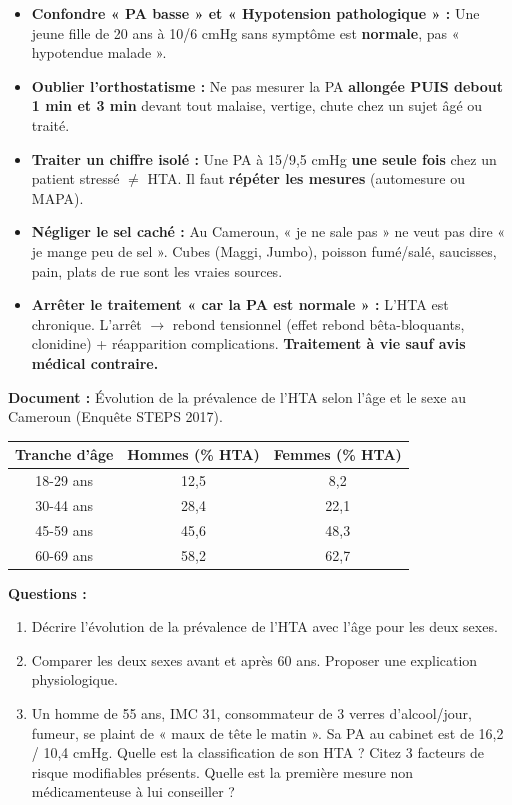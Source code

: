 \documentclass[11pt]{article}
\begin{document}
\begin{attention}
\begin{itemize}
    \item \textbf{Confondre « PA basse » et « Hypotension pathologique » :} Une jeune fille de 20 ans à 10/6 cmHg sans symptôme est \textbf{normale}, pas « hypotendue malade ».
    \item \textbf{Oublier l'orthostatisme :} Ne pas mesurer la PA \textbf{allongée PUIS debout 1 min et 3 min} devant tout malaise, vertige, chute chez un sujet âgé ou traité.
    \item \textbf{Traiter un chiffre isolé :} Une PA à 15/9,5 cmHg \textbf{une seule fois} chez un patient stressé $\neq$ HTA. Il faut \textbf{répéter les mesures} (automesure ou MAPA).
    \item \textbf{Négliger le sel caché :} Au Cameroun, « je ne sale pas » ne veut pas dire « je mange peu de sel ». Cubes (Maggi, Jumbo), poisson fumé/salé, saucisses, pain, plats de rue sont les vraies sources.
    \item \textbf{Arrêter le traitement « car la PA est normale » :} L'HTA est chronique. L'arrêt $\rightarrow$ rebond tensionnel (effet rebond bêta-bloquants, clonidine) + réapparition complications. \textbf{Traitement à vie sauf avis médical contraire.}
\end{itemize}
\end{attention}

\begin{exercice}
\textbf{Document :} Évolution de la prévalence de l'HTA selon l'âge et le sexe au Cameroun (Enquête STEPS 2017).
\begin{center}
\begin{tabular}{|c|c|c|}\hline
\textbf{Tranche d'âge} & \textbf{Hommes (\% HTA)} & \textbf{Femmes (\% HTA)} \\ \hline
18-29 ans & 12,5 & 8,2 \\ \hline
30-44 ans & 28,4 & 22,1 \\ \hline
45-59 ans & 45,6 & 48,3 \\ \hline
60-69 ans & 58,2 & 62,7 \\ \hline
\end{tabular}
\end{center}
\textbf{Questions :}
\begin{enumerate}
    \item Décrire l'évolution de la prévalence de l'HTA avec l'âge pour les deux sexes.
    \item Comparer les deux sexes avant et après 60 ans. Proposer une explication physiologique.
    \item Un homme de 55 ans, IMC 31, consommateur de 3 verres d'alcool/jour, fumeur, se plaint de « maux de tête le matin ». Sa PA au cabinet est de 16,2 / 10,4 cmHg. Quelle est la classification de son HTA ? Citez 3 facteurs de risque modifiables présents. Quelle est la première mesure non médicamenteuse à lui conseiller ?
\end{enumerate}
\end{exercice}
\end{document}
